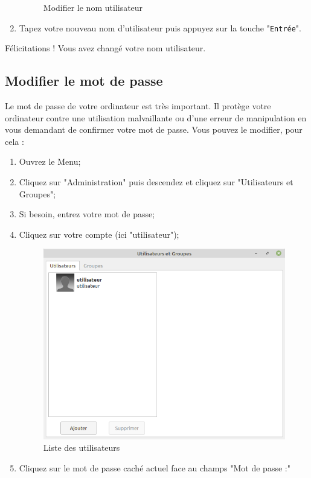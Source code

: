 \documentclass[12pt]{book}
\begin{document}
\begin{enumerate}
\begin{figure}[h]
				\caption{Modifier le nom utilisateur}
				\label{fig:nomuser}
			\end{figure}
			\item Tapez votre nouveau nom d'utilisateur puis appuyez sur la touche "\texttt{Entrée}".
		\end{enumerate}
		Félicitations ! Vous avez changé votre nom utilisateur.
	\subsection{Modifier le mot de passe}
		Le mot de passe de votre ordinateur est très important. 
		Il protège votre ordinateur contre une utilisation malvaillante ou d'une erreur de manipulation en vous demandant de confirmer votre mot de passe.
		Vous pouvez le modifier, pour cela :
		\begin{enumerate}
			\item Ouvrez le Menu;
			\item Cliquez sur "Administration" puis descendez et cliquez sur "Utilisateurs et Groupes";
			\item Si besoin, entrez votre mot de passe;
			\item Cliquez sur votre compte (ici "utilisateur");
			\begin{figure}[h]
				\centering
				\includegraphics[width=\textwidth]{include/users.png}
				\caption{Liste des utilisateurs}
				\label{fig:nomuser}
			\end{figure}
			\item Cliquez sur le mot de passe caché actuel face au champs "Mot de passe :"

\end{enumerate}
\end{document}
